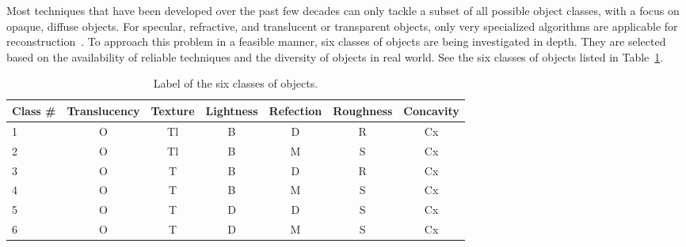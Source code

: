 Most techniques that have been developed over the past few decades can only tackle a subset of all possible object classes, with a focus on opaque, diffuse objects. For specular, refractive, and translucent or transparent objects, only very specialized algorithms are applicable for reconstruction~\cite{ihrke2010transparent}. To approach this problem in a feasible manner, six classes of objects are being investigated in depth. They are selected based on the availability of reliable techniques and the diversity of objects in real world. See the six classes of objects listed in Table~\ref{tab:six_obj_class}.
\begin{table}[!htbp]
\centering
\begin{tabular}{l|*{6}{c}}
\toprule
Class \# & Translucency & Texture & Lightness & Refection & Roughness & Concavity\\
\midrule
1 & O & Tl & B & D & R & Cx\\
2 & O & Tl & B & M & S & Cx\\
3 & O & T & B & D & R & Cx\\
4 & O & T & B & M & S & Cx\\
5 & O & T & D & D & S & Cx\\
6 & O & T & D & M & S & Cx\\
\bottomrule
\end{tabular}
\caption{Label of the six classes of objects.}
\label{tab:six_obj_class}
\end{table}


